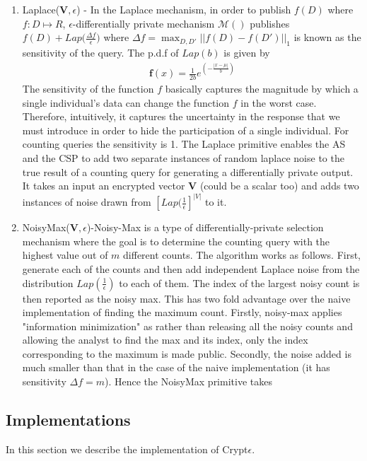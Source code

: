 \begin{enumerate}
	\item Laplace($\mathbf{V},\epsilon$) - In the Laplace mechanism, in order
to publish $f(D)$ where $f : D \mapsto R$, $\epsilon$-differentially private mechanism $\mathcal{M()}$ 
publishes $f(D) + Lap\Big(\frac{\Delta f}{\epsilon}\Big)$  
where $\Delta f = \max_{D,D'}||f(D)-f(D')||_1$ is known as the sensitivity of the query. The p.d.f of $Lap(b)$ is given by\begin{gather}\mathbf{f}(x)={\frac  {1}{2b}}e^{ \left(-{\frac  {|x-\mu |}{b}}\right)}\end{gather} The sensitivity of the function $f$ basically captures the magnitude by which a single individual’s data can change the function $f$ in the worst case. Therefore, intuitively, it captures the uncertainty in the response that we must introduce in order to hide the participation of a single individual. For counting queries the sensitivity is 1. The Laplace primitive enables the AS and the CSP to add two separate instances of random laplace noise to the true result of a counting query for generating a differentially private output. It takes an input an encrypted vector $\mathbf{V}$ (could be a scalar too) and adds two instances of noise drawn from $[Lap(\frac{1}{\epsilon}]^{|V|}$ to it.

	\item NoisyMax($\mathbf{V},\epsilon$)-Noisy-Max is a type of differentially-private selection mechanism where the goal is to determine the counting query with the highest value out of $m$ different counts.  
	The algorithm works as follows. First, generate each of the counts and then add independent Laplace noise from the distribution $Lap(\frac{1}{\epsilon})$ to each of them. The index of the largest noisy count is then reported as the noisy max.
	This has two fold advantage over the naive implementation of finding the maximum count.
Firstly, noisy-max applies "information minimization" as rather than releasing all the noisy counts
and allowing the analyst to find the max and its index, only the
index corresponding to the maximum is made public.
Secondly, the noise added is much smaller than that in the case of the naive implementation (it has sensitivity $\Delta f=m$).  
Hence the NoisyMax primitive takes
\end{enumerate}
\subsection{Implementations}\label{implementation}
In this section we describe the implementation of Crypt$\epsilon$.
